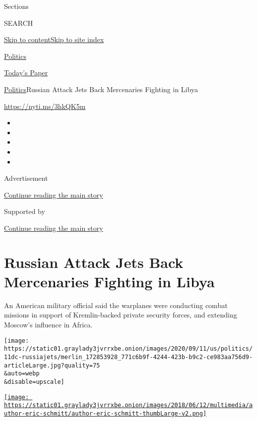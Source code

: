 Sections

SEARCH

\protect\hyperlink{site-content}{Skip to
content}\protect\hyperlink{site-index}{Skip to site index}

\href{https://www.nytimes3xbfgragh.onion/section/politics}{Politics}

\href{https://myaccount.nytimes3xbfgragh.onion/auth/login?response_type=cookie\&client_id=vi}{}

\href{https://www.nytimes3xbfgragh.onion/section/todayspaper}{Today's
Paper}

\href{/section/politics}{Politics}\textbar{}Russian Attack Jets Back
Mercenaries Fighting in Libya

\url{https://nyti.ms/3hkQK5m}

\begin{itemize}
\item
\item
\item
\item
\item
\end{itemize}

Advertisement

\protect\hyperlink{after-top}{Continue reading the main story}

Supported by

\protect\hyperlink{after-sponsor}{Continue reading the main story}

\hypertarget{russian-attack-jets-back-mercenaries-fighting-in-libya}{%
\section{Russian Attack Jets Back Mercenaries Fighting in
Libya}\label{russian-attack-jets-back-mercenaries-fighting-in-libya}}

An American military official said the warplanes were conducting combat
missions in support of Kremlin-backed private security forces, and
extending Moscow's influence in Africa.

\texttt{[image: https://static01.graylady3jvrrxbe.onion/images/2020/09/11/us/politics/11dc-russiajets/merlin\_172853928\_771c6b9f-4244-423b-b9c2-ce983aa756d9-articleLarge.jpg?quality=75\\\&auto=webp\\\&disable=upscale]}

\href{https://www.nytimes3xbfgragh.onion/by/eric-schmitt}{\texttt{[image: https://static01.graylady3jvrrxbe.onion/images/2018/06/12/multimedia/author-eric-schmitt/author-eric-schmitt-thumbLarge-v2.png]}}

